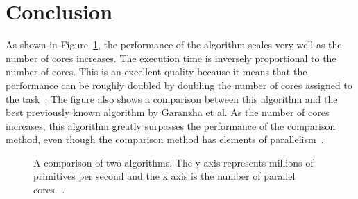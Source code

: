 \documentclass{sig-alternate}
\begin{document}
%



\section{Conclusion}
\label{sec:conclusion}

As shown in Figure~\ref{fig:RadixCores}, the performance of the algorithm scales very well as the number of cores increases. The execution time is inversely proportional to the number of cores. This is an excellent quality because it means that the performance can be roughly doubled by doubling the number of cores assigned to the task~\cite{Karras:2012}. The figure also shows a comparison between this algorithm and the best previously known algorithm by Garanzha et al. As the number of cores increases, this algorithm greatly surpasses the performance of the comparison method, even though the comparison method has elements of parallelism~\cite{Garanzha:2011}.


\begin{figure}
\centering
{}
\caption{A comparison of two algorithms. The y axis represents millions of primitives per second and the x axis is the number of parallel cores.~\cite{Karras:2012}.}
\label{fig:RadixCores}
\end{figure}

\end{document}
